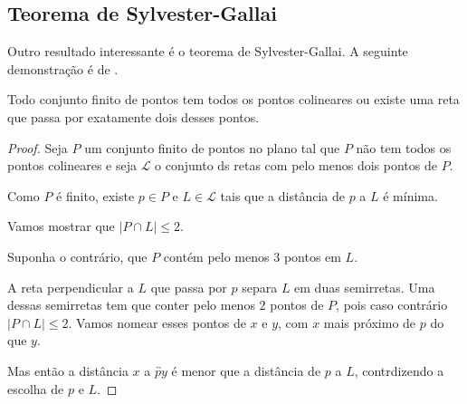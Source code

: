 \subsection{Teorema de Sylvester-Gallai}
Outro resultado interessante é o teorema de Sylvester-Gallai. A seguinte demonstração é de \cite{Kelly1986}.


\begin{teorema}
    Todo conjunto finito de pontos tem todos os pontos colineares ou existe uma reta que passa por exatamente dois desses pontos.
\end{teorema}
\begin{proof}
    Seja $P$ um conjunto finito de pontos no plano tal que $P$ não tem todos os pontos colineares e seja $\mathcal L$ o conjunto ds retas com pelo menos dois pontos de $P$.

    Como $P$ é finito, existe $p\in P$ e $L\in\mathcal L$ tais que a distância de $p$ a $L$ é mínima.

    Vamos mostrar que $|P\cap L|\leq 2$.
    \begin{center}
    \end{center}

    Suponha o contrário, que $P$ contém pelo menos 3 pontos em $L$.

    A reta perpendicular a $L$ que passa por $p$ separa $L$ em duas semirretas. Uma dessas semirretas tem que conter pelo menos $2$ pontos de $P$, pois caso contrário $|P\cap L|\leq 2$. Vamos nomear esses pontos de $x$ e $y$, com $x$ mais próximo de $p$ do que $y$.

    Mas então a distância $x$ a $\overleftrightarrow{py}$  é menor que a distância de $p$ a $L$, contrdizendo a escolha de $p$ e $L$.
\end{proof}


